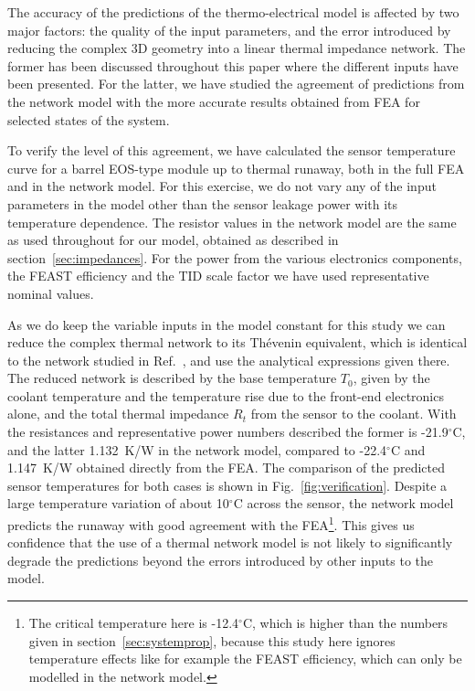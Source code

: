 The accuracy of the predictions of the thermo-electrical model is affected by two major factors: the quality of the input parameters, and the error introduced by reducing the complex 3D geometry into a linear thermal impedance network. The former has been discussed throughout this paper where the different inputs have been presented. For the latter, we have studied the agreement of predictions from the network model with the more accurate results obtained from FEA for selected states of the system.

To verify the level of this agreement, we have calculated the sensor temperature curve for a barrel EOS-type module up to thermal runaway, both in the full FEA and in the network model. For this exercise, we do not vary any of the input parameters in the model other than the sensor leakage power with its temperature dependence. The resistor values in the network model are the same as used throughout for our model, obtained as described in section~\ref{sec:impedances}. For the power from the various electronics components, the FEAST efficiency and the TID scale factor we have used representative nominal values.

As we do keep the variable inputs in the model constant for this study we can reduce the complex thermal network to its Th\'{e}venin equivalent, which is identical to the network studied in Ref.~\cite{Beck:2010zzd}, and use the analytical expressions given there. The reduced network is described by the base temperature $T_0$, given by the coolant temperature and the temperature rise due to the front-end electronics alone, and the total thermal impedance $R_t$ from the sensor to the coolant. With the resistances and representative power numbers described the former is -21.9$^\circ$C, and the latter 1.132~K/W in the network model, compared to -22.4$^\circ$C and 1.147~K/W obtained directly from the FEA. The comparison of the predicted sensor temperatures for both cases is shown in Fig.~\ref{fig:verification}. Despite a large temperature variation of about 10$^\circ$C across the sensor, the network model predicts the runaway with good agreement with the FEA\footnote{The critical temperature here is -12.4$^\circ$C, which is higher than the numbers given in section~\ref{sec:systemprop}, because this study here ignores temperature effects like for example the FEAST efficiency, which can only be modelled in the network model.}. This gives us confidence that the use of a thermal network model is not likely to significantly degrade the predictions beyond the errors introduced by other inputs to the model. 


